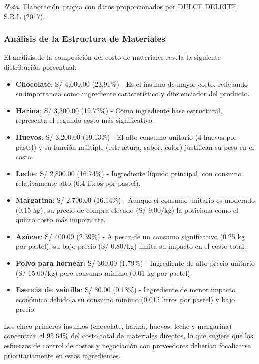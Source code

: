 \documentclass[
  stu,
  floatsintext,
  longtable,
  a4paper,
  nolmodern,
  notxfonts,
  notimes,
  12pt,
  colorlinks=true,linkcolor=blue,citecolor=blue,urlcolor=blue]{apa7}
\providecommand{\tightlist}{%
  \setlength{\itemsep}{0pt}\setlength{\parskip}{0pt}}
\begin{document}
\begin{table}
\noindent \emph{Nota.} Elaboración~propia con datos proporcionados por
DULCE DELEITE S.R.L (2017).

\end{table}

\subsubsection{Análisis de la Estructura de
Materiales}\label{anuxe1lisis-de-la-estructura-de-materiales}

El análisis de la composición del costo de materiales revela la
siguiente distribución porcentual:

\begin{itemize}
\tightlist
\item
  \textbf{Chocolate}: S/ 4,000.00 (23.91\%) - Es el insumo de mayor
  costo, reflejando su importancia como ingrediente característico y
  diferenciador del producto.
\item
  \textbf{Harina}: S/ 3,300.00 (19.72\%) - Como ingrediente base
  estructural, representa el segundo costo más significativo.
\item
  \textbf{Huevos}: S/ 3,200.00 (19.13\%) - El alto consumo unitario (4
  huevos por pastel) y su función múltiple (estructura, sabor, color)
  justifican su peso en el costo.
\item
  \textbf{Leche}: S/ 2,800.00 (16.74\%) - Ingrediente líquido principal,
  con consumo relativamente alto (0.4 litros por pastel).
\item
  \textbf{Margarina}: S/ 2,700.00 (16.14\%) - Aunque el consumo unitario
  es moderado (0.15 kg), su precio de compra elevado (S/ 9.00/kg) la
  posiciona como el quinto costo más importante.
\item
  \textbf{Azúcar}: S/ 400.00 (2.39\%) - A pesar de un consumo
  significativo (0.25 kg por pastel), su bajo precio (S/ 0.80/kg) limita
  su impacto en el costo total.
\item
  \textbf{Polvo para hornear}: S/ 300.00 (1.79\%) - Ingrediente de alto
  precio unitario (S/ 15.00/kg) pero consumo mínimo (0.01 kg por
  pastel).
\item
  \textbf{Esencia de vainilla}: S/ 30.00 (0.18\%) - Ingrediente de menor
  impacto económico debido a su consumo mínimo (0.015 litros por pastel)
  y bajo precio.
\end{itemize}

Los cinco primeros insumos (chocolate, harina, huevos, leche y
margarina) concentran el 95.64\% del costo total de materiales directos,
lo que sugiere que los esfuerzos de control de costos y negociación con
proveedores deberían focalizarse prioritariamente en estos ingredientes.
\end{document}
